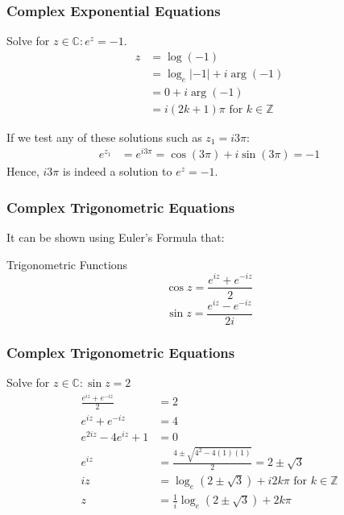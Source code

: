 \documentclass{beamer}
\begin{document}
\begin{frame}
  \frametitle{Complex Exponential Equations}
  \begin{example}
    Solve for $z \in \mathbb{C}: e^z = -1$.
    \pause
    \begin{align*}
      z & = \log(-1)\\
        & = \log_e|-1| + i\arg(-1)\\
        & = 0 + i\arg(-1)\\
        & = i(2k+1)\pi \mbox{ for } k \in \mathbb{Z}
    \end{align*}
  \end{example}
  \pause
  If we test any of these solutions such as $z_1 = i3\pi$:
  \begin{align*}
    e^{z_1} & = e^{i3\pi} = \cos(3\pi) + i \sin(3\pi) = -1
  \end{align*}
  Hence, $i3\pi$ is indeed a solution to $e^z = -1$.
\end{frame}

\begin{frame}
  \frametitle{Complex Trigonometric Equations}
  It can be shown using Euler's Formula that:
  \begin{block}{Trigonometric Functions}
    \[\cos z = \frac{e^{iz} + e^{-iz}}{2}\]
    \[\sin z = \frac{e^{iz} - e^{-iz}}{2i}\]
  \end{block}
\end{frame}
\begin{frame}
  \frametitle{Complex Trigonometric Equations}
  \begin{example}
  Solve for $z \in \mathbb{C}: \sin z = 2$
  \pause
  \begin{align*}
    \frac{e^{iz} + e^{-iz}}{2} & = 2\\
    e^{iz} + e^{-iz} & = 4\\
    e^{2iz} - 4e^{iz} + 1 & = 0\\
    e^{iz} & = \frac{4 \pm \sqrt{4^2 - 4(1)(1)}}{2} = 2 \pm \sqrt{3}\\
    iz & = \log_e(2 \pm \sqrt{3}) + i2k\pi \mbox{ for } k \in \mathbb{Z}\\
    z & = \frac{1}{i}\log_e(2 \pm \sqrt{3}) + 2k\pi
  \end{align*}
  \end{example}
\end{frame}
\end{document}
